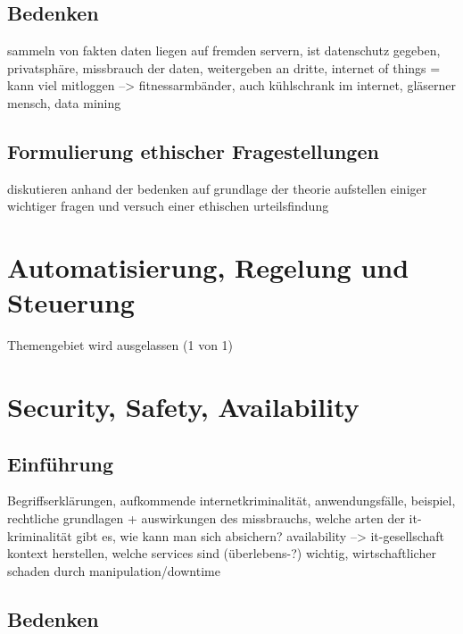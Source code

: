 \documentclass[letterpaper, 12pt]{article}
\let\tempsection\section
\renewcommand\section[1]{\vspace{-0.3cm}\tempsection{#1}\vspace{-0.3cm}}
\let\tempsubsection\subsection
\renewcommand\subsection[1]{\vspace{0cm}\tempsubsection{#1}\vspace{0cm}}
\begin{document}
\subsection{Bedenken}

sammeln von fakten \newline
daten liegen auf fremden servern, ist datenschutz gegeben, privatsphäre, missbrauch der daten,
weitergeben an dritte, internet of things = kann viel mitloggen --> fitnessarmbänder, auch kühlschrank im internet, gläserner mensch, data mining

\subsection{Formulierung ethischer Fragestellungen}

diskutieren anhand der bedenken auf grundlage der theorie \newline
aufstellen einiger wichtiger fragen und versuch einer ethischen urteilsfindung

\clearpage

\section{Automatisierung, Regelung und Steuerung}

Themengebiet wird ausgelassen (1 von 1)

\clearpage

\section{Security, Safety, Availability}

\subsection{Einführung}

Begriffserklärungen, aufkommende internetkriminalität, anwendungsfälle, beispiel, rechtliche grundlagen + auswirkungen des missbrauchs, welche arten der it-kriminalität gibt es, wie kann man sich absichern? \newline availability --> it-gesellschaft kontext herstellen, welche services sind (überlebens-?) wichtig, wirtschaftlicher schaden durch manipulation/downtime

\subsection{Bedenken}
\end{document}
